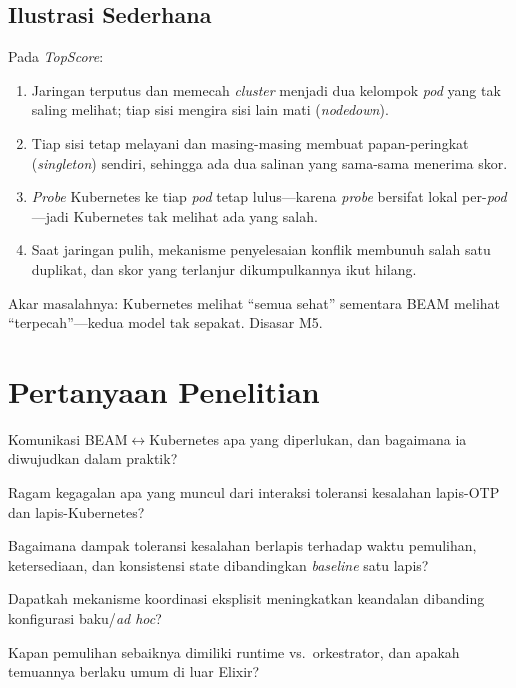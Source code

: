 \subsection{Ilustrasi Sederhana}
\label{subsec:p5-ilustrasi}
Pada \emph{TopScore}:
\begin{enumerate}[nosep,leftmargin=2em]
  \item Jaringan terputus dan memecah \emph{cluster} menjadi dua kelompok \emph{pod} yang
        tak saling melihat; tiap sisi mengira sisi lain mati (\emph{nodedown}).
  \item Tiap sisi tetap melayani dan masing-masing membuat papan-peringkat (\emph{singleton})
        sendiri, sehingga ada dua salinan yang sama-sama menerima skor.
  \item \emph{Probe} Kubernetes ke tiap \emph{pod} tetap lulus---karena \emph{probe} bersifat
        lokal per-\emph{pod}---jadi Kubernetes tak melihat ada yang salah.
  \item Saat jaringan pulih, mekanisme penyelesaian konflik membunuh salah satu duplikat,
        dan skor yang terlanjur dikumpulkannya ikut hilang.
\end{enumerate}
\noindent Akar masalahnya: Kubernetes melihat ``semua sehat'' sementara BEAM melihat
``terpecah''---kedua model tak sepakat. Disasar M5.

\section{Pertanyaan Penelitian}
\label{sec:rq}
\begin{description}[leftmargin=2.6em,style=sameline,nosep]
  \item[RQ1] Komunikasi BEAM$\leftrightarrow$Kubernetes apa yang diperlukan, dan bagaimana
        ia diwujudkan dalam praktik?
  \item[RQ2] Ragam kegagalan apa yang muncul dari interaksi toleransi kesalahan lapis-OTP
        dan lapis-Kubernetes?
  \item[RQ3] Bagaimana dampak toleransi kesalahan berlapis terhadap waktu pemulihan,
        ketersediaan, dan konsistensi state dibandingkan \emph{baseline} satu lapis?
  \item[RQ4] Dapatkah mekanisme koordinasi eksplisit meningkatkan keandalan dibanding
        konfigurasi baku/\emph{ad hoc}?
  \item[RQ5] Kapan pemulihan sebaiknya dimiliki runtime vs.\ orkestrator, dan apakah
        temuannya berlaku umum di luar Elixir?
\end{description}
